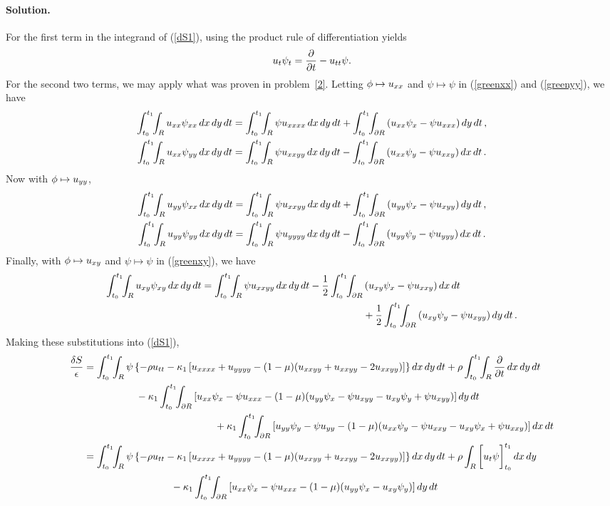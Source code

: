 \documentclass[11pt]{article}
\newcommand{\refeq}[1]{(\ref{#1})}
\newcommand{\beq}{\begin{equation*}}
\newcommand{\eeq}{\end{equation*}}
\newenvironment{solution}
{
    \paragraph{Solution.}
    \ignorespaces
}
{
}
\begin{document}
\begin{solution}
	For the first term in the integrand of \refeq{dS1}, using the product rule of differentiation yields
	\beq
		\ut \psit = \pdv{}{t} (\ut \psi) - \utt \psi.
	\eeq
	For the second two terms, we may apply what was proven in problem~\ref{2}.  Letting $\phi \mapsto u_{xx}$ and $\psi \mapsto \psi$ in \refeq{greenxx} and \refeq{greenyy}, we have
	\begin{align*}
		\inttr \uxx \psixx \drt &= \inttr \psi \uxxxx \drt + \inttdr \left( \uxx \psix - \psi \uxxx \right) \dd{y} \dd{t}, \\
		\inttr \uxx \psiyy \drt &= \inttr \psi \uxxyy \drt - \inttdr \left( \uxx \psiy - \psi \uxxy \right) \dd{x} \dd{t}.
	\end{align*}
	Now with $\phi \mapsto u_{yy}$,
	\begin{align*}
		\inttr \uyy \psixx \drt &= \inttr \psi \uxxyy \drt + \inttdr \left( \uyy \psix - \psi \uxyy \right) \dd{y} \dd{t}, \\
		\inttr \uyy \psiyy \drt &= \inttr \psi \uyyyy \drt - \inttdr \left( \uyy \psiy - \psi \uyyy \right) \dd{x} \dd{t}.
	\end{align*}
	Finally, with $\phi \mapsto u_{xy}$ and $\psi \mapsto \psi$ in \refeq{greenxy}, we have
	\begin{align*}
		\inttr \uxy \psixy \drt = \inttr \psi \uxxyy \drt - \frac{1}{2} \inttdr &\left( \uxy \psix - \psi \uxxy \right) \dd{x} \dd{t} \\
		&+ \frac{1}{2} \inttdr \left( \uxy \psiy - \psi \uxyy \right) \dd{y} \dd{t}.
	\end{align*}
	Making these substitutions into \refeq{dS1},
	\begin{align*}
		\frac{\dS}{\eps} &= \inttr \psi \left\{ -\rho \utt - \kaq \left[ \uxxxx + \uyyyy - (1 - \mu) (\uxxyy + \uxxyy - 2 \uxxyy) \right] \right\} \drt + \rho \inttr \pdv{}{t} (\ut \psi) \drt \notag \\
		&\phantom{mmmmmm}- \kaq \inttdr \left[ \uxx \psix - \psi \uxxx - (1 - \mu) (\uyy \psix - \psi \uxyy - \uxy \psiy + \psi \uxyy) \right] \dd{y} \dd{t} \notag \\
		&\phantom{mmmmmmmmmmmmmmm} + \kaq \inttdr \left[ \uyy \psiy - \psi \uyy - (1 - \mu) (\uxx \psiy - \psi \uxxy - \uxy \psix + \psi \uxxy) \right] \dd{x} \dd{t} \\
		&= \inttr \psi \left\{ -\rho \utt - \kaq \left[ \uxxxx + \uyyyy - (1 - \mu) (\uxxyy + \uxxyy - 2 \uxxyy) \right] \right\} \drt + \rho \intr \bigg[\ut \psi\bigg]_{t_0}^{t_1} \dd{x} \dd{y} \\
		&\phantom{mmmmmmmmmm} - \kaq \inttdr \left[ \uxx \psix - \psi \uxxx - (1 - \mu) (\uyy \psix - \uxy \psiy) \right] \dd{y} \dd{t} \\

\end{align*}
\end{solution}
\end{document}
